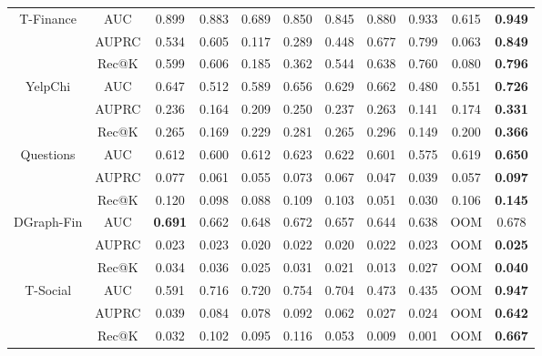\begin{table}[t!]
{\begin{tabular}{cc|ccccccccc}
\multirow{3}{*}{T-Finance}  & AUC     & 0.899 & 0.883 & 0.689 & 0.850 & 0.845 & 0.880 & 0.933 & 0.615 & \textbf{0.949} \\
                            & AUPRC   & 0.534 & 0.605 & 0.117 & 0.289 & 0.448 & 0.677 & 0.799 & 0.063 & \textbf{0.849} \\
                            & Rec@K   & 0.599 & 0.606 & 0.185 & 0.362 & 0.544 & 0.638 & 0.760 & 0.080 & \textbf{0.796} \\ \hline
\multirow{3}{*}{YelpChi}    & AUC     & 0.647 & 0.512 & 0.589 & 0.656 & 0.629 & 0.662 & 0.480 & 0.551 & \textbf{0.726} \\
                            & AUPRC   & 0.236 & 0.164 & 0.209 & 0.250 & 0.237 & 0.263 & 0.141 & 0.174 & \textbf{0.331} \\
                            & Rec@K   & 0.265 & 0.169 & 0.229 & 0.281 & 0.265 & 0.296 & 0.149 & 0.200 & \textbf{0.366} \\ \hline
\multirow{3}{*}{Questions}  & AUC     & 0.612 & 0.600 & 0.612 & 0.623 & 0.622 & 0.601 & 0.575 & 0.619 & \textbf{0.650} \\
                            & AUPRC   & 0.077 & 0.061 & 0.055 & 0.073 & 0.067 & 0.047 & 0.039 & 0.057 & \textbf{0.097} \\
                            & Rec@K   & 0.120 & 0.098 & 0.088 & 0.109 & 0.103 & 0.051 & 0.030 & 0.106 & \textbf{0.145} \\ \hline
\multirow{3}{*}{DGraph-Fin} & AUC     & \textbf{0.691} & 0.662 & 0.648 & 0.672 & 0.657 & 0.644 & 0.638 & OOM   & 0.678          \\
                            & AUPRC   & 0.023 & 0.023 & 0.020 & 0.022 & 0.020 & 0.022 & 0.023 & OOM   & \textbf{0.025} \\
                            & Rec@K   & 0.034 & 0.036 & 0.025 & 0.031 & 0.021 & 0.013 & 0.027 & OOM   & \textbf{0.040} \\ \hline
\multirow{3}{*}{T-Social}   & AUC     & 0.591 & 0.716 & 0.720 & 0.754 & 0.704 & 0.473 & 0.435 & OOM   & \textbf{0.947} \\
                            & AUPRC   & 0.039 & 0.084 & 0.078 & 0.092 & 0.062 & 0.027 & 0.024 & OOM   & \textbf{0.642} \\
                            & Rec@K   & 0.032 & 0.102 & 0.095 & 0.116 & 0.053 & 0.009 & 0.001 & OOM   & \textbf{0.667} \\  \hline  \hline
\end{tabular}
}
\end{table}